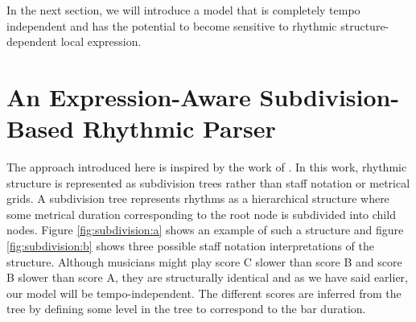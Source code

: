 In the next section, we will introduce a model that is completely tempo independent and has the potential to become sensitive to rhythmic structure-dependent local expression.

\section{An Expression-Aware Subdivision-Based Rhythmic Parser}
\label{sec:introducing}



The approach introduced here is inspired by the work of \citet{longuet1976perception}. In this work, rhythmic structure is represented as subdivision trees rather than staff notation or metrical grids. A subdivision tree represents rhythms as a hierarchical structure where some metrical duration corresponding to the root node is subdivided into child nodes. Figure \ref{fig:subdivision:a} shows an example of such a structure and figure \ref{fig:subdivision:b} shows three possible staff notation interpretations of the structure. Although musicians might play score C slower than score B and score B slower than score A, they are structurally identical and as we have said earlier, our model will be tempo-independent. The different scores are inferred from the tree by defining some level in the tree to correspond to the bar duration.

